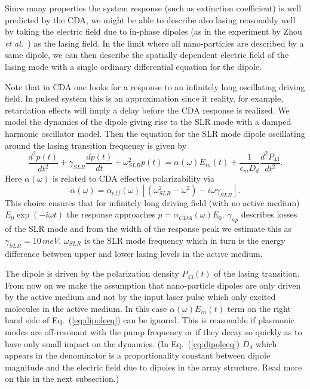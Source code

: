 \documentclass{iopart}
\newcommand{\beq}{\begin{equation}}
\newcommand{\enq}{\end{equation}}
\begin{document}
Since many properties the system response (such as extinction coefficient)
is well predicted by the CDA,
we might be able to describe also lasing reasonably well by taking the electric field
due to in-phase dipoles (as in the experiment by Zhou {\it et al.}~\cite{zhou_lasing_2013}) as the lasing field. In the limit where all nano-particles
are described by a same dipole, we can then describe the spatially dependent
electric field of the lasing mode with a single ordinary differential equation
for the dipole.

Note that in CDA one looks for a response to an infinitely long oscillating driving field.
In pulsed system this is an approximation since it reality, for example, retardation effects
will imply a delay before the CDA response is realized.
We model the dynamics of the dipole giving rise to the SLR mode with a damped harmonic oscillator model. Then the equation for the SLR mode dipole oscillating around the lasing transition frequency is given by
\beq
\frac{d^2p(t)}{dt^2}+\gamma_{SLR}\frac{dp(t)}{dt}+\omega_{SLR}^2p(t)=
\alpha(\omega)E_{in}(t)+
\frac{1}{\epsilon_m D_d}\frac{d^2P_{43}}{dt^2}.
\label{eq:dipoleeq}
\enq
Here $\alpha(\omega)$ is related to CDA effective polarizability via
\beq
\alpha(\omega)=\alpha_{eff}(\omega)\left[(\omega_{SLR}^2-\omega^2)-i\omega\gamma_{SLR}\right].
\enq
This choice ensures that for infinitely long driving field (with no active medium)
$E_{0}\exp(-i\omega t)$ the response approaches 
$p=\alpha_{CDA}(\omega)E_{0}$. $\gamma_{np}$ describes losses
of the SLR mode and from the width of the response peak
we estimate this as $\gamma_{SLR}=10\, meV$.
$\omega_{SLR}$ is the SLR mode frequency which in turn is the energy
difference between upper and lower lasing levels in the active medium.

The dipole is driven by the polarization density $P_{43}(t)$ of the 
lasing transition. From now on we make the assumption that nano-particle dipoles are only driven by the active medium
and not by the input laser pulse which only excited molecules in the active medium. In this case $\alpha(\omega)E_{in}(t)$ term on the right hand side
of Eq.~(\ref{eq:dipoleeq}) can be ignored.
This is reasonable if plasmonic modes are off-resonant with the pump
frequency or if they decay so quickly as to have only small impact on the dynamics. (In Eq.~(\ref{eq:dipoleeq})
$D_d$ which appears in the denominator is a proportionality constant
between dipole magnitude and the electric field due to dipoles in the array structure. Read more on this in the next subsection.)
\end{document}
